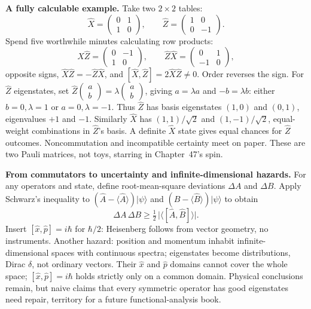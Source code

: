 \begin{mathbridge}
\textbf{A fully calculable example.} Take two $2\times2$ tables:
\[
\hat{X}=\begin{pmatrix} 0 & 1 \\ 1 & 0 \end{pmatrix},\qquad
\hat{Z}=\begin{pmatrix} 1 & 0 \\ 0 & -1 \end{pmatrix}.
\]
Spend five worthwhile minutes calculating row products:
\[
\hat{X}\hat{Z}=\begin{pmatrix} 0 & -1 \\ 1 & 0 \end{pmatrix},\qquad
\hat{Z}\hat{X}=\begin{pmatrix} 0 & 1 \\ -1 & 0 \end{pmatrix},
\]
opposite signs, $\hat{X}\hat{Z}=-\hat{Z}\hat{X}$, and $[\hat{X},\hat{Z}]=2\hat{X}\hat{Z}\neq0$. Order reverses the sign. For $\hat{Z}$ eigenstates, set $\hat{Z}\begin{pmatrix}a\\b\end{pmatrix}=\lambda\begin{pmatrix}a\\b\end{pmatrix}$, giving $a=\lambda a$ and $-b=\lambda b$: either $b=0,\lambda=1$ or $a=0,\lambda=-1$. Thus $\hat{Z}$ has basis eigenstates $(1,0)$ and $(0,1)$, eigenvalues $+1$ and $-1$. Similarly $\hat{X}$ has $(1,1)/\sqrt2$ and $(1,-1)/\sqrt2$, equal-weight combinations in $\hat{Z}$'s basis. A definite $\hat{X}$ state gives equal chances for $\hat{Z}$ outcomes. Noncommutation and incompatible certainty meet on paper. These are two Pauli matrices, not toys, starring in Chapter~47's spin.
\end{mathbridge}

\begin{challenge}
\textbf{From commutators to uncertainty and infinite-dimensional hazards.} For any operators and state, define root-mean-square deviations $\Delta A$ and $\Delta B$. Apply Schwarz's inequality to $(\hat{A}-\langle\hat{A}\rangle)|\psi\rangle$ and $(\hat{B}-\langle\hat{B}\rangle)|\psi\rangle$ to obtain
\[
\Delta A\,\Delta B\geq\tfrac12\,\bigl|\langle[\hat{A},\hat{B}]\rangle\bigr|.
\]
Insert $[\hat{x},\hat{p}]=i\hbar$ for $\hbar/2$: Heisenberg follows from vector geometry, no instruments. Another hazard: position and momentum inhabit infinite-dimensional spaces with continuous spectra; eigenstates become distributions, Dirac $\delta$, not ordinary vectors. Their $\hat{x}$ and $\hat{p}$ domains cannot cover the whole space; $[\hat{x},\hat{p}]=i\hbar$ holds strictly only on a common domain. Physical conclusions remain, but naive claims that every symmetric operator has good eigenstates need repair, territory for a future functional-analysis book.
\end{challenge}

